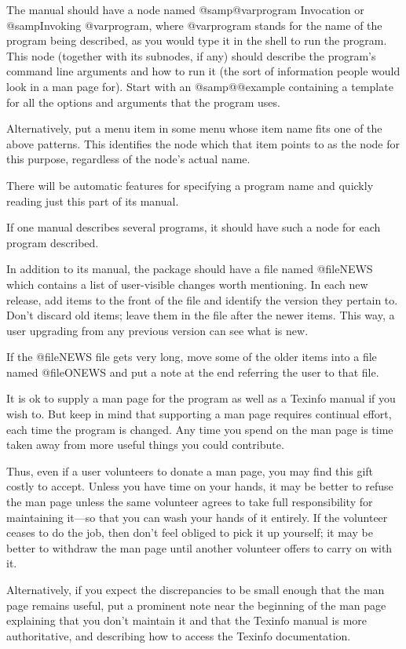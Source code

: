 The manual should have a node named @samp{@var{program} Invocation} or
@samp{Invoking @var{program}}, where @var{program} stands for the name
of the program being described, as you would type it in the shell to run
the program.  This node (together with its subnodes, if any) should
describe the program's command line arguments and how to run it (the
sort of information people would look in a man page for).  Start with an
@samp{@@example} containing a template for all the options and arguments
that the program uses.

Alternatively, put a menu item in some menu whose item name fits one of
the above patterns.  This identifies the node which that item points to
as the node for this purpose, regardless of the node's actual name.

There will be automatic features for specifying a program name and
quickly reading just this part of its manual.

If one manual describes several programs, it should have such a node for
each program described.

In addition to its manual, the package should have a file named
@file{NEWS} which contains a list of user-visible changes worth
mentioning.  In each new release, add items to the front of the file and
identify the version they pertain to.  Don't discard old items; leave
them in the file after the newer items.  This way, a user upgrading from
any previous version can see what is new.

If the @file{NEWS} file gets very long, move some of the older items
into a file named @file{ONEWS} and put a note at the end referring the
user to that file.

It is ok to supply a man page for the program as well as a Texinfo
manual if you wish to.  But keep in mind that supporting a man page
requires continual effort, each time the program is changed.  Any time
you spend on the man page is time taken away from more useful things you
could contribute.

Thus, even if a user volunteers to donate a man page, you may find this
gift costly to accept.  Unless you have time on your hands, it may be
better to refuse the man page unless the same volunteer agrees to take
full responsibility for maintaining it---so that you can wash your hands
of it entirely.  If the volunteer ceases to do the job, then don't feel
obliged to pick it up yourself; it may be better to withdraw the man
page until another volunteer offers to carry on with it.

Alternatively, if you expect the discrepancies to be small enough that
the man page remains useful, put a prominent note near the beginning of
the man page explaining that you don't maintain it and that the Texinfo
manual is more authoritative, and describing how to access the Texinfo
documentation.

